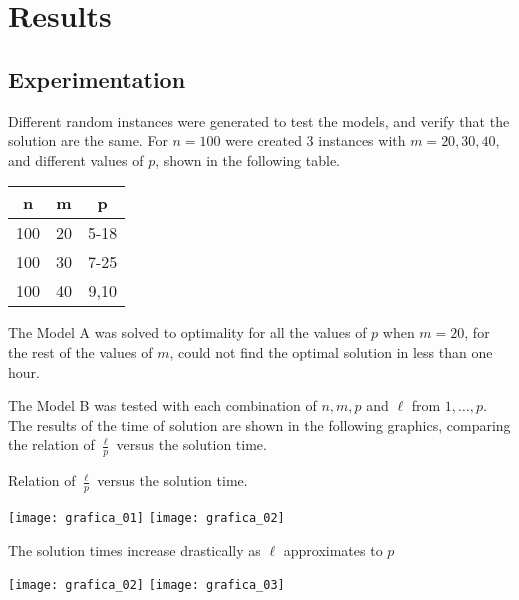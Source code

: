 
\section{Results}
\subsection{Experimentation}
\begin{frame}
  
  Different random instances were generated
  to test the models, and verify that the solution are the same.
  For $n = 100$ were created 3 instances with $m = 20,30,40$,
  and different values of $p$, shown in the following table.
  \begin{table}
    \centerign
    \begin{tabular}{|c|c|c|}\hline
      n & m & p \\ \hline
      100 & 20 & 5-18 \\
      100 & 30 & 7-25 \\
      100 & 40 & 9,10 \\
      \hline
    \end{tabular}
  \end{table}
  
  The Model A was solved to optimality for all the values of $p$ when $m = 20$,
  for the rest of the values of $m$, could not find the optimal solution in less than one hour.

  The Model B was tested with each combination of $n,m,p$ and $\ell$ from $1,\ldots,p$.
  The results of the time of solution are shown in the following graphics,
  comparing the relation of $\frac{\ell}{p}$ versus the solution time.

\end{frame}

\begin{frame}
  Relation of $\frac{\ell}{p}$ versus the solution time.
  \begin{center}
    \texttt{[image: grafica\_01]}
    \texttt{[image: grafica\_02]}
  \end{center}
\end{frame}

\begin{frame}

  The solution times increase drastically as $\ell$ approximates to $p$
  
  \begin{center}
    \texttt{[image: grafica\_02]}
    \texttt{[image: grafica\_03]}
  \end{center}
  
\end{frame}

